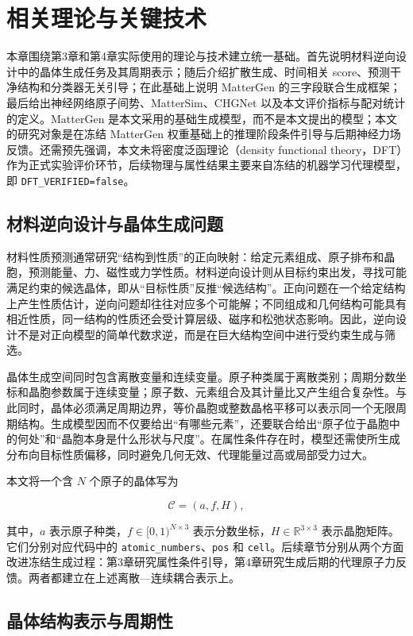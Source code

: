 \chapter{相关理论与关键技术}

本章围绕第3章和第4章实际使用的理论与技术建立统一基础。首先说明材料逆向设计中的晶体生成任务及其周期表示；随后介绍扩散生成、时间相关 score、预测干净结构和分类器无关引导；在此基础上说明 MatterGen 的三字段联合生成框架；最后给出神经网络原子间势、Matter\allowbreak Sim、CHGNet 以及本文评价指标与配对统计的定义。MatterGen 是本文采用的基础生成模型，而不是本文提出的模型；本文的研究对象是在冻结 MatterGen 权重基础上的推理阶段条件引导与后期神经力场反馈。还需预先强调，本文未将密度泛函理论（density functional theory，DFT）作为正式实验评价环节，后续物理与属性结果主要来自冻结的机器学习代理模型，即 \texttt{DFT\_VERIFIED=false}。

\section{材料逆向设计与晶体生成问题}

材料性质预测通常研究``结构到性质''的正向映射：给定元素组成、原子排布和晶胞，预测能量、力、磁性或力学性质。材料逆向设计则从目标约束出发，寻找可能满足约束的候选晶体，即从``目标性质''反推``候选结构''。正向问题在一个给定结构上产生性质估计，逆向问题却往往对应多个可能解；不同组成和几何结构可能具有相近性质，同一结构的性质还会受计算层级、磁序和松弛状态影响。因此，逆向设计不是对正向模型的简单代数求逆，而是在巨大结构空间中进行受约束生成与筛选。

晶体生成空间同时包含离散变量和连续变量。原子种类属于离散类别；周期分数坐标和晶胞参数属于连续变量；原子数、元素组合及其计量比又产生组合复杂性。与此同时，晶体必须满足周期边界，等价晶胞或整数晶格平移可以表示同一个无限周期结构。生成模型因而不仅要给出``有哪些元素''，还要联合给出``原子位于晶胞中的何处''和``晶胞本身是什么形状与尺度''。在属性条件存在时，模型还需使所生成分布向目标性质偏移，同时避免几何无效、代理能量过高或局部受力过大。

本文将一个含 \(N\) 个原子的晶体写为

\[
\mathcal C=(a,f,H),
\tag{2-1}
\]

其中，\(a\) 表示原子种类，\(f\in[0,1)^{N\times3}\) 表示分数坐标，\(H\in\mathbb R^{3\times3}\) 表示晶胞矩阵。它们分别对应代码中的 \texttt{atomic\_numbers}、\texttt{pos} 和 \texttt{cell}。后续章节分别从两个方面改进冻结生成过程：第3章研究属性条件引导，第4章研究生成后期的代理原子力反馈。两者都建立在上述离散---连续耦合表示上。

\section{晶体结构表示与周期性}

